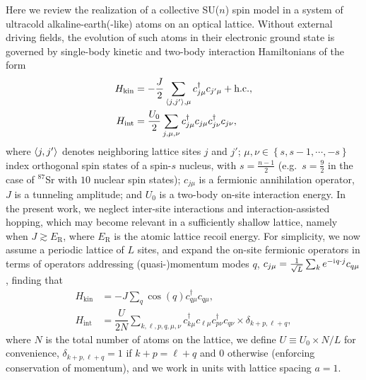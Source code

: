 \documentclass[nofootinbib,twocolumn]{revtex4-2}
\renewcommand{\t}{\text} %
\newcommand{\f}[2]{\dfrac{#1}{#2}} %
\newcommand{\p}[1]{\left(#1\right)} %
\renewcommand{\set}[1]{\left\{#1\right\}} %
\newcommand{\bk}{\Braket} %
\renewcommand{\c}{\cdot} %
\renewcommand{\i}{\mathrm{i}\mkern1mu} %
\newcommand{\1}{\mathds{1}}
\begin{document}
Here we review the realization of a collective SU($n$) spin model in a system of ultracold alkaline-earth(-like) atoms on an optical lattice.
Without external driving fields, the evolution of such atoms in their electronic ground state is governed by single-body kinetic and two-body interaction Hamiltonians of the form
\begin{align}
  H_{\t{kin}}
  &= -\f{J}{2} \sum_{\bk{j,j'},\mu} c_{j\mu}^\dag c_{j'\mu} + \t{h.c.}, \\
  H_{\t{int}}
  &= \f{U_0}{2} \sum_{j,\mu,\nu}
  c_{j\mu}^\dag c_{j\mu} c_{j\nu}^\dag c_{j\nu},
\end{align}
where $\bk{j,j'}$ denotes neighboring lattice sites $j$ and $j'$; $\mu,\nu\in\set{s,s-1,\cdots,-s}$ index orthogonal spin states of a spin-$s$ nucleus, with $s=\frac{n-1}{2}$ (e.g.~$s=\frac{9}{2}$ in the case of ${}^{87}$Sr with $10$ nuclear spin states); $c_{j\mu}$ is a fermionic annihilation operator, $J$ is a tunneling amplitude; and $U_0$ is a two-body on-site interaction energy.
In the present work, we neglect inter-site interactions and interaction-assisted hopping, which may become relevant in a sufficiently shallow lattice, namely when $J\gtrsim E_{\t{R}}$, where $E_{\t{R}}$ is the atomic lattice recoil energy.
For simplicity, we now assume a periodic lattice of $L$ sites, and expand the on-site fermionic operators in terms of operators addressing (quasi-)momentum modes $q$, $c_{j\mu}=\frac1{\sqrt{L}}\sum_k e^{-\i q\c j} c_{q\mu}$, finding that
\begin{align}
  H_{\t{kin}}
  &= -J\sum_q \cos\p{q} c_{q\mu}^\dag c_{q\mu}, \\
  H_{\t{int}}
  &= \f{U}{2N} \sum_{k,\ell,p,q,\mu,\nu}
  c_{k\mu}^\dag c_{\ell\mu} c_{p\nu}^\dag c_{q\nu}
  \times \delta_{k+p,\ell+q},
  \label{eq:H_int_momenta}
\end{align}
where $N$ is the total number of atoms on the lattice, we define $U\equiv U_0\times N/L$ for convenience, $\delta_{k+p,\ell+q}=1$ if $k+p=\ell+q$ and $0$ otherwise (enforcing conservation of momentum), and we work in units with lattice spacing $a=1$.
\end{document}
